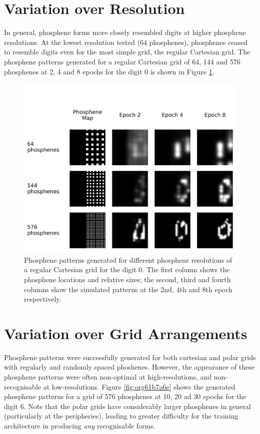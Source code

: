 \documentclass[a4paper,11pt,openany]{book}
\begin{document}
\section*{Variation over Resolution}
\label{sec:org2f76742}

In general, phosphene forms more closely resembled digits at higher phosphene resolutions.
At the lowest resolution tested (64 phosphenes), phosphenes ceased to resemble digits even for the most simple grid, the regular Cartesian grid.
The phosphene patterns generated for a regular Cartesian grid of 64, 144 and 576 phosphenes at 2, 4 and 8 epochs for the digit 0 is shown in Figure \ref{fig:org9801c6b}.

\begin{figure}[htbp]
\centering
\includegraphics[width=.9\linewidth]{./images/results_different_resolution.png}
\caption{\label{fig:org9801c6b}
Phosphene patterns generated for different phosphene resolutions of a regular Cartesian grid for the digit 0. The first column shows the phosphene locations and relative sizes; the second, third and fourth columns show the simulated patterns at the 2nd, 4th and 8th epoch respectively.}
\end{figure}

\section*{Variation over Grid Arrangements}
\label{sec:org96c3a0b}

Phosphene patterns were successfully generated for both cartesian and polar grids with regularly and randomly spaced phoshenes.
However, the appearance of these phosphene patterns were often non-optimal at high-resolutions, and non-recognisable at low-resolutions.
Figure \ref{fig:org61b7a6e} shows the generated phosphene patterns for a grid of 576 phosphenes at 10, 20 ad 30 epochs for the digit 6.
Note that the polar grids have considerably larger phosphenes in general (particularly at the peripheries), leading to greater difficulty for the training architecture in producing \emph{any} recognisable forms.
\end{document}
